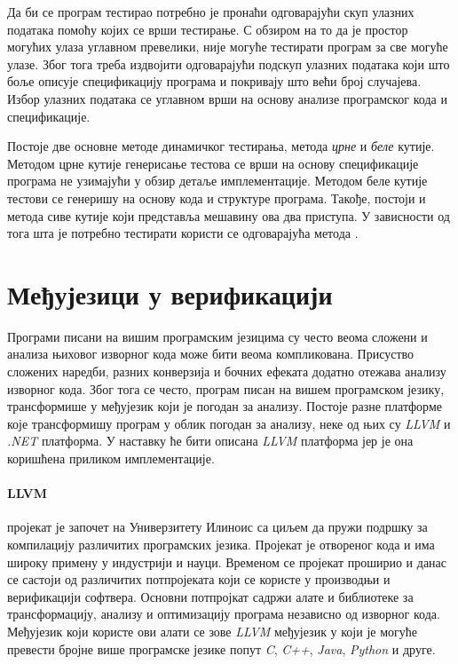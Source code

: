 \documentclass[12pt,oneside]{memoir}
\begin{document}
   Да би се програм тестирао потребно је пронаћи одговарајући скуп улазних података помоћу којих се врши тестирање.  С обзиром на то да је простор могућих улаза углавном превелики, није могуће тестирати програм за све могуће улазе. Због тога треба издвојити одговарајући подскуп улазних података који што боље описује спецификацију програма и покривају што већи број случајева. Избор улазних података се углавном врши на основу анализе програмског кода и спецификације. 
   
    Постоје две основне методе динамичког тестирања, метода \textit{црне} и 
 \textit{беле} кутије.  Методом црне кутије генерисање тестова се врши на основу спецификације програма не узимајући у обзир детаље имплементације. Методом беле кутије тестови се генеришу на основу кода и структуре програма. Такође, постоји и метода сиве кутије који представља мешавину ова два приступа. У зависности од тога шта је потребно тестирати користи се одговарајућа метода \cite{testing}. 
  
  \section{Међујезици у верификацији}
  
  Програми писани на вишим програмским језицима су често веома сложени и анализа њиховог изворног кода може бити веома компликована. Присуство сложених наредби, разних конверзија и бочних ефеката додатно отежава анализу изворног кода. Због тога се често, програм писан на вишем програмском језику, трансформише у међујезик који је погодан за анализу. Постоје разне платформе које трансформишу програм у облик погодан за анализу, неке од њих су \textit{LLVM} и \textit{.NET} платформа. У наставку ће бити описана \textit{LLVM} платформа јер је она коришћена приликом имплементације.
  
  \paragraph{LLVM} \cite{llvm} пројекат је започет на Универзитету Илиноис са циљем да пружи подршку за компилацију различитих програмских језика. Пројекат је отвореног кода и има широку примену у индустрији и науци. Временом се пројекат проширио и данас се састоји од различитих потпројеката који се користе у производњи и верификацији софтвера. Основни потпројкат садржи алате и библиотеке за трансформацију, анализу и оптимизацију програма независно од изворног кода. Међујезик који користе ови алати се зове \textit{LLVM} међујезик у који је могуће превести бројне више програмске језике попут \textit{C}, \textit{C++}, \textit{Java}, \textit{Python} и друге.
  
\end{document}
